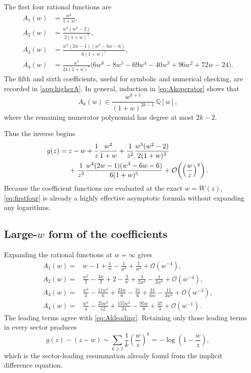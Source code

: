 \documentclass[11pt]{article}
\theoremstyle{clean}
\newcommand{\bigO}{\mathcal O}
\begin{document}
The first four rational functions are
\begin{align}
 A_1(w)&=\frac{w^2}{1+w},\label{eq:A1}\\[0.25em]
 A_2(w)&=\frac{w^3(w^2-2)}{2(1+w)^3},\label{eq:A2}\\[0.25em]
 A_3(w)&=\frac{w^4(2w-1)(w^3-6w-6)}{6(1+w)^5},\label{eq:A3}\\[0.25em]
 A_4(w)&=\frac{w^5}{24(1+w)^7}
 \bigl(6w^6-8w^5-69w^4-40w^3
       +96w^2+72w-24\bigr).\label{eq:A4}
\end{align}
The fifth and sixth coefficients, useful for symbolic and numerical checking,
are recorded in \cref{app:higherA}.  In general, induction in
\cref{eq:Akoperator} shows that
\begin{equation}\label{eq:Akstructure}
  A_k(w)\in
  \frac{w^{k+1}}{(1+w)^{2k-1}}\,\mathbb Q[w],
\end{equation}
where the remaining numerator polynomial has degree at most \(2k-2\).

Thus the inverse begins
\begin{align}
 g(z)={}&z-w
 +\frac{1}{z}\frac{w^2}{1+w}
 +\frac{1}{z^2}\frac{w^3(w^2-2)}{2(1+w)^3}\notag\\
 &+\frac{1}{z^3}
   \frac{w^4(2w-1)(w^3-6w-6)}{6(1+w)^5}
 +\bigO\!\left(\left(\frac{w}{z}\right)^4\right).
 \label{eq:firstfour}
\end{align}
Because the coefficient functions are evaluated at the exact \(w=W(z)\),
\cref{eq:firstfour} is already a highly effective asymptotic formula without
expanding any logarithms.

\subsection{Large-\texorpdfstring{\(w\)}{w} form of the coefficients}

Expanding the rational functions at \(w=\infty\) gives
\begin{align}
 A_1(w)={}&w-1+\frac1w-\frac1{w^2}+\frac1{w^3}
 +\bigO(w^{-4}),\label{eq:A1large}\\
 A_2(w)={}&\frac{w^2}{2}-\frac{3w}{2}+2-\frac2w
 +\frac{3}{2w^2}-\frac{1}{2w^3}+\bigO(w^{-4}),\label{eq:A2large}\\
 A_3(w)={}&\frac{w^3}{3}-\frac{11w^2}{6}
 +\frac{23w}{6}-\frac{31}{6}+\frac{31}{6w}
 -\frac{11}{3w^2}+\bigO(w^{-3}),\label{eq:A3large}\\
 A_4(w)={}&\frac{w^4}{4}-\frac{25w^3}{12}
 +\frac{155w^2}{24}-\frac{95w}{8}+\frac{47}{3}
 +\bigO(w^{-1}).\label{eq:A4large}
\end{align}
The leading terms agree with \cref{eq:Akleading}.  Retaining only those
leading terms in every sector produces
\[
  g(z)-(z-w)\sim
  \sum_{k\ge1}\frac1k\left(\frac{w}{z}\right)^k
  =-\log\left(1-\frac{w}{z}\right),
\]
which is the sector-leading resummation already found from the implicit
difference equation.
\end{document}
